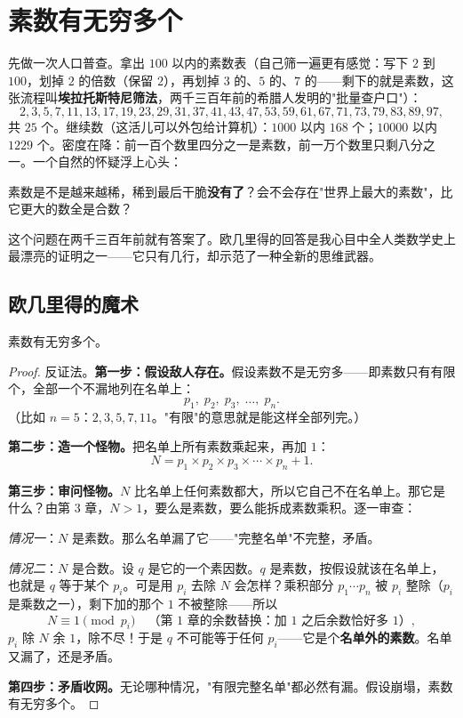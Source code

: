 \chapter{素数有无穷多个}

先做一次人口普查。拿出 $100$ 以内的素数表（自己筛一遍更有感觉：写下 $2$ 到 $100$，划掉 $2$ 的倍数（保留 $2$），再划掉 $3$ 的、$5$ 的、$7$ 的——剩下的就是素数，这张流程叫\textbf{埃拉托斯特尼筛法}，两千三百年前的希腊人发明的"批量查户口"）：
\[
2,3,5,7,11,13,17,19,23,29,31,37,41,43,47,53,59,61,67,71,73,79,83,89,97 ,
\]
共 $25$ 个。继续数（这活儿可以外包给计算机）：$1000$ 以内 $168$ 个；$10000$ 以内 $1229$ 个。密度在降：前一百个数里四分之一是素数，前一万个数里只剩八分之一。一个自然的怀疑浮上心头：

\begin{kaiwei}
素数是不是越来越稀，稀到最后干脆\textbf{没有了}？会不会存在"世界上最大的素数"，比它更大的数全是合数？
\end{kaiwei}

这个问题在两千三百年前就有答案了。欧几里得的回答是我心目中全人类数学史上最漂亮的证明之一——它只有几行，却示范了一种全新的思维武器。

\section{欧几里得的魔术}

\begin{dingli}
素数有无穷多个。
\end{dingli}

\begin{proof}
反证法。\textbf{第一步：假设敌人存在。}假设素数不是无穷多——即素数只有有限个，全部一个不漏地列在名单上：
\[
p_1, \; p_2, \; p_3, \; \dots, \; p_n .
\]
（比如 $n = 5$：$2, 3, 5, 7, 11$。"有限"的意思就是能这样全部列完。）

\textbf{第二步：造一个怪物。}把名单上所有素数乘起来，再加 $1$：
\[
N = p_1 \times p_2 \times p_3 \times \cdots \times p_n + 1 .
\]

\textbf{第三步：审问怪物。}$N$ 比名单上任何素数都大，所以它自己不在名单上。那它是什么？由第 3 章，$N > 1$，要么是素数，要么能拆成素数乘积。逐一审查：

\emph{情况一}：$N$ 是素数。那么名单漏了它——"完整名单"不完整，矛盾。

\emph{情况二}：$N$ 是合数。设 $q$ 是它的一个素因数。$q$ 是素数，按假设就该在名单上，也就是 $q$ 等于某个 $p_i$。可是用 $p_i$ 去除 $N$ 会怎样？乘积部分 $p_1\cdots p_n$ 被 $p_i$ 整除（$p_i$ 是乘数之一），剩下加的那个 $1$ 不被整除——所以
\[
N \equiv 1 \pmod{p_i} \quad\text{（第 1 章的余数替换：加 $1$ 之后余数恰好多 $1$）},
\]
$p_i$ 除 $N$ 余 $1$，除不尽！于是 $q$ 不可能等于任何 $p_i$——它是个\textbf{名单外的素数}。名单又漏了，还是矛盾。

\textbf{第四步：矛盾收网。}无论哪种情况，"有限完整名单"都必然有漏。假设崩塌，素数有无穷多个。
\end{proof}

